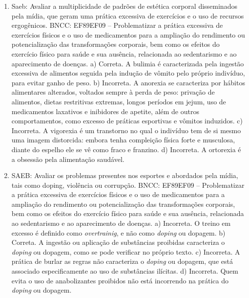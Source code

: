 
\begin{enumerate}
\item
Saeb: Avaliar a multiplicidade de padrões de estética corporal
disseminados pela mídia, que geram uma prática excessiva de exercícios e
o uso de recursos ergogênicos.
BNCC: EF89EF09 -- Problematizar a prática excessiva de exercícios físicos
e o uso de medicamentos para a ampliação do rendimento ou
potencialização das transformações corporais, bem como os efeitos do
exercício físico para saúde e sua ausência, relacionada ao sedentarismo
e ao aparecimento de doenças.
a) Correta. A bulimia é caracterizada pela ingestão excessiva de alimentos
seguida pela indução de vômito pelo próprio indivíduo, para evitar
ganho de peso.
b) Incorreta. A anorexia se caracteriza por hábitos alimentares 
alterados, voltados sempre à perda de peso: privação de alimentos, 
dietas restritivas extremas, longos períodos em jejum, uso de 
medicamentos laxativos e inibidores de apetite, além de outros 
comportamentos, como excesso de práticas esportivas e vômitos
induzidos. 
c) Incorreta. A vigorexia é um transtorno no qual o indivíduo
tem de si mesmo uma imagem distorcida: embora tenha compleição
física forte e musculosa, diante do espelho ele se vê como fraco
e franzino.
d) Incorreta. A ortorexia é a obsessão pela alimentação saudável.

\item
SAEB: Avaliar os problemas presentes nos esportes e abordados pela
mídia, tais como doping, violência ou corrupção.
BNCC: EF89EF09 -- Problematizar a prática excessiva de exercícios físicos
e o uso de medicamentos para a ampliação do rendimento ou
potencialização das transformações corporais, bem como os efeitos do
exercício físico para saúde e sua ausência, relacionada ao sedentarismo
e ao aparecimento de doenças.
a) Incorreta. O treino em excesso é definido como \textit{overtrainig},
e não como \textit{doping} ou dopagem.
b) Correta. A ingestão ou aplicação de substâncias proibidas caracteriza
o \textit{doping} ou dopagem, como se pode verificar no próprio texto.
c) Incorreta. A prática de burlar as regras não caracteriza o 
\textit{doping} ou dopagem, que está associado especificamente ao uso
de substâncias ilícitas. 
d) Incorreta. Quem evita o uso de anabolizantes proibidos não está
incorrendo na prática do \textit{doping} ou dopagem.


\end{enumerate}
